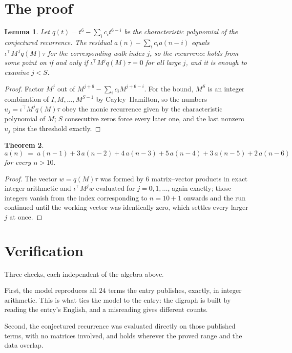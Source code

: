 \documentclass[11pt,a4paper]{article}
\theoremstyle{plain}
\newtheorem{theorem}{Theorem}
\newtheorem{lemma}[theorem]{Lemma}
\theoremstyle{definition}
\begin{document}
\section{The proof}

\begin{lemma}\label{lem:crit}
Let $q(t)=t^{6}-\sum_i c_it^{6-i}$ be the characteristic polynomial of the
conjectured recurrence. The residual $a(n)-\sum_ic_ia(n-i)$ equals
$\iota^{\!\top}M^{\,j}q(M)\tau$ for the corresponding walk index $j$, so the recurrence
holds from some point on if and only if $\iota^{\!\top}M^{j}q(M)\tau=0$ for all large $j$,
and it is enough to examine $j<S$.
\end{lemma}

\begin{proof}
Factor $M^{j}$ out of $M^{j+6}-\sum_ic_iM^{j+6-i}$. For the bound, $M^{S}$
is an integer combination of $I,M,\dots,M^{S-1}$ by Cayley--Hamilton, so the numbers
$u_j=\iota^{\!\top}M^{j}q(M)\tau$ obey the monic recurrence given by the characteristic
polynomial of $M$; $S$ consecutive zeros force every later one, and the last nonzero $u_j$
pins the threshold exactly.
\end{proof}

\begin{theorem}
\[
a(n)\;=\;a(n-1) + 3\,a(n-2) + 4\,a(n-3) + 5\,a(n-4) + 3\,a(n-5) + 2\,a(n-6)
\]
for every $n>10$.
\end{theorem}

\begin{proof}
The vector $w=q(M)\tau$ was formed by $6$ matrix--vector products in exact integer
arithmetic and $\iota^{\!\top}M^{j}w$ evaluated for $j=0,1,\dots$, again exactly; those
integers vanish from the index corresponding to $n=10+1$ onwards and the run continued
until the working vector was identically zero, which settles every larger $j$ at once.
\end{proof}

\section{Verification}

Three checks, each independent of the algebra above.

First, the model reproduces all $24$ terms the entry publishes, exactly, in integer
arithmetic. This is what ties the model to the entry: the digraph is built by reading the
entry's English, and a misreading gives different counts.

Second, the conjectured recurrence was evaluated directly on those published terms, with no
matrices involved, and holds wherever the proved range and the data overlap.
\end{document}
